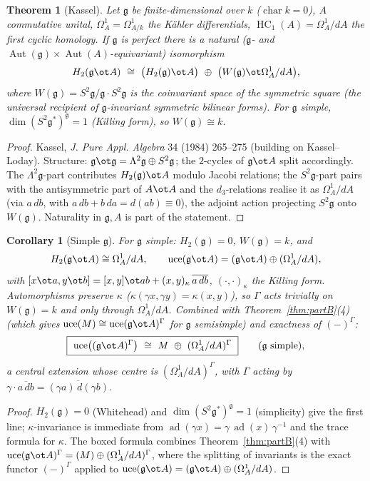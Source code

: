 \documentclass{amsart}
\newtheorem{theorem}{Theorem}
\newtheorem{corollary}{Corollary}
\theoremstyle{definition}
\DeclareMathOperator{\uce}{uce}
\DeclareMathOperator{\HC}{HC}
\DeclareMathOperator{\Aut}{Aut}
\newcommand{\g}{\mathfrak{g}}
\newcommand{\Om}{\Omega}
\newcommand{\Gm}{\Gamma}
\begin{document}
\begin{theorem}[Kassel]\label{thm:kassel}
Let $\g$ be finite-dimensional over $k$ ($\operatorname{char}k=0$), $A$
commutative unital, $\Om^1_A=\Om^1_{A/k}$ the K\"ahler differentials,
$\HC_1(A)=\Om^1_A/dA$ the first cyclic homology.  If $\g$ is perfect there is a
natural ($\g$- and $\Aut(\g)\!\times\!\Aut(A)$-equivariant) isomorphism
\begin{equation}\label{eq:kassel}
   H_2(\g\ot A)\ \cong\ \bigl(H_2(\g)\ot A\bigr)\ \oplus\
   \bigl(W(\g)\ot\Om^1_A/dA\bigr),
\end{equation}
where $W(\g)=S^2\g/\g\!\cdot\!S^2\g$ is the coinvariant space of the symmetric
square (the universal recipient of $\g$-invariant symmetric bilinear forms).  For
$\g$ simple, $\dim(S^2\g^*)^{\g}=1$ (Killing form), so $W(\g)\cong k$.
\end{theorem}
\begin{proof}
Kassel, \emph{J. Pure Appl. Algebra} 34 (1984) 265--275 (building on
Kassel--Loday).  Structure: $\g\ot\g=\Lambda^2\g\oplus S^2\g$; the $2$-cycles of
$\g\ot A$ split accordingly.  The $\Lambda^2\g$-part contributes $H_2(\g)\ot A$
modulo Jacobi relations; the $S^2\g$-part pairs with the antisymmetric part of
$A\ot A$ and the $d_3$-relations realise it as $\Om^1_A/dA$ (via $a\,db$, with
$a\,db+b\,da=d(ab)\equiv0$), the adjoint action projecting $S^2\g$ onto $W(\g)$.
Naturality in $\g,A$ is part of the statement.
\end{proof}

\begin{corollary}[Simple $\g$]\label{cor:simple}
For $\g$ simple: $H_2(\g)=0$, $W(\g)=k$, and
\[
   H_2(\g\ot A)\cong\Om^1_A/dA,\qquad
   \uce(\g\ot A)=(\g\ot A)\oplus(\Om^1_A/dA),
\]
with $[x\ot a,y\ot b]=[x,y]\ot ab+(x,y)_\kappa\,\overline{a\,db}$,
$(\cdot,\cdot)_\kappa$ the Killing form.  Automorphisms preserve $\kappa$
($\kappa(\gamma x,\gamma y)=\kappa(x,y)$), so $\Gm$ acts trivially on $W(\g)=k$
and only through $\Om^1_A/dA$.  Combined with Theorem~\ref{thm:partB}(4) (which
gives $\uce(M)\cong\uce(\g\ot A)^{\Gm}$ for $\g$ semisimple) and exactness of
$(-)^{\Gm}$:
\[
   \boxed{\ \uce\bigl((\g\ot A)^{\Gm}\bigr)\ \cong\ M\ \oplus\ (\Om^1_A/dA)^{\Gm}\ }
   \qquad(\g\ \text{simple}),
\]
a central extension whose centre is $(\Om^1_A/dA)^{\Gm}$, with $\Gm$ acting by
$\gamma\cdot\overline{a\,db}=\overline{(\gamma a)\,d(\gamma b)}$.
\end{corollary}
\begin{proof}
$H_2(\g)=0$ (Whitehead) and $\dim(S^2\g^*)^\g=1$ (simplicity) give the first line;
$\kappa$-invariance is immediate from $\operatorname{ad}(\gamma x)=\gamma\,
\operatorname{ad}(x)\,\gamma^{-1}$ and the trace formula for $\kappa$.  The boxed
formula combines Theorem~\ref{thm:partB}(4) with
$\uce(\g\ot A)^{\Gm}=(M)\oplus(\Om^1_A/dA)^{\Gm}$, where the splitting of
invariants is the exact functor $(-)^{\Gm}$ applied to
$\uce(\g\ot A)=(\g\ot A)\oplus(\Om^1_A/dA)$.
\end{proof}
\end{document}
